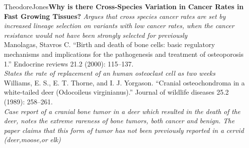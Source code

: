 \documentclass[12pt,letterpaper]{article}
\begin{document}
\begin{mla}{Theodore}{Jones}{}{}{}{\textbf{Why is there Cross-Species Variation in Cancer Rates in Fast Growing Tissues?}}
\emph{Argues that cross species cancer rates are set by increased lineage selection on variants with low cancer rates, when the cancer resistance would not have been strongly selected for previously} \\

Manolagas, Stavros C. “Birth and death of bone cells: basic regulatory mechanisms and implications for the pathogenesis and treatment of osteoporosis 1.” Endocrine reviews 21.2 (2000): 115–137. \\

\emph{States the rate of replacement of an human osteoclast cell as two weeks}\\
\newpage
Williams, E. S., E. T. Thorne, and I. J. Yorgason. “Cranial osteochondroma in a white-tailed deer (Odocoileus virginianus).” Journal of wildlife diseases 25.2 (1989): 258–261. \\

\emph{Case report of a cranial bone tumor in a deer which resulted in the death of the deer, notes the extreme rareness of bone tumors, both cancer and benign. The paper claims that this form of tumor has not been previously reported in a cervid (deer,moose,or elk)}

\end{mla}
\end{document}
